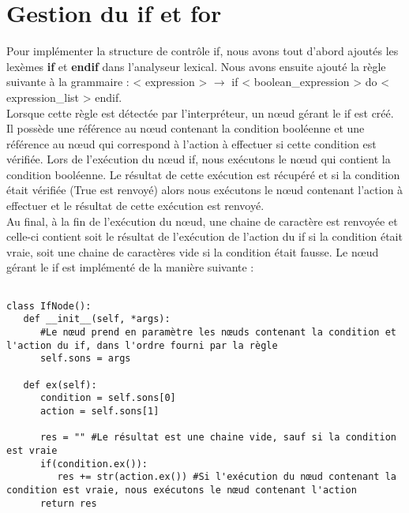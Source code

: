 \documentclass[a4paper,10pt]{article}
\begin{document}
\section{Gestion du \textbf{if} et \textbf{for}}
Pour implémenter la structure de contrôle \textrm{if}, nous avons tout d'abord ajoutés les lexèmes \textbf{if} et \textbf{endif} dans l'analyseur lexical. Nous avons ensuite ajouté la 
règle suivante à la grammaire : < expression > $\rightarrow$ if < boolean\_expression > do < expression\_list > endif. \\
Lorsque cette règle est détectée par l'interpréteur, un nœud gérant le if est créé. Il possède une référence au nœud contenant la condition booléenne et une référence au nœud qui correspond
à l'action à effectuer si cette condition est vérifiée. Lors de l'exécution du nœud \textrm{if}, nous exécutons le nœud qui contient la condition booléenne. Le résultat de cette exécution
est récupéré et si la condition était vérifiée (\textrm{True} est renvoyé) alors nous exécutons le nœud contenant l'action à effectuer et le résultat de cette exécution est renvoyé. \\
Au final, à la fin de l'exécution du nœud, une chaine de caractère est renvoyée et celle-ci contient soit le résultat de l'exécution de l'action du if si la condition était vraie, soit une
chaine de caractères vide si la condition était fausse. 
\newline
Le nœud gérant le \textrm{if} est implémenté de la manière suivante : \\
\begin{verbatim}

class IfNode():
   def __init__(self, *args):
      #Le nœud prend en paramètre les nœuds contenant la condition et l'action du if, dans l'ordre fourni par la règle
      self.sons = args
         
   def ex(self):
      condition = self.sons[0]
      action = self.sons[1]

      res = "" #Le résultat est une chaine vide, sauf si la condition est vraie
      if(condition.ex()):
         res += str(action.ex()) #Si l'exécution du nœud contenant la condition est vraie, nous exécutons le nœud contenant l'action
      return res
 
\end{verbatim}
\end{document}

